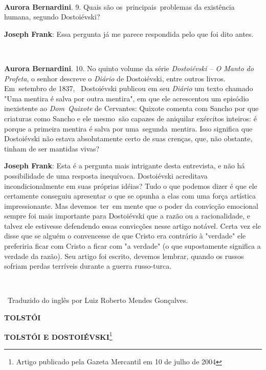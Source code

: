 ~

\textbf{Aurora Bernardini}. 9. Quais são os~principais~problemas da
existência humana, segundo Dostoiévski?

\textbf{Joseph Frank}: Essa pergunta já me parece respondida pelo que
foi dito antes.

~

\textbf{Aurora Bernardini}. 10. No quinto volume da série
\emph{Dostoiévski -- O Manto do Profeta}, o senhor descreve o
\emph{Diário} de Dostoiévski, entre outros livros. Em~setembro de 1837,
~Dostoiévski publicou em seu \emph{Diário} um texto chamado "Uma mentira
é salva por outra mentira", em que ele acrescentou um episódio
inexistente ao \emph{Dom~Quixote} de Cervantes: Quixote comenta com
Sancho por que criaturas como Sancho e ele mesmo\emph{~}são capazes de
aniquilar exércitos inteiros: é porque a primeira mentira é salva por
uma~segunda~mentira. Isso significa que Dostoiévski não estava
absolutamente certo de suas crenças, que, não obstante, tinham de ser
mantidas vivas?

\textbf{Joseph Frank}: Esta é a pergunta mais intrigante desta
entrevista, e não há possibilidade de uma resposta inequívoca.
Dostoiévski acreditava incondicionalmente em suas próprias idéias? Tudo
o que podemos dizer é que ele certamente conseguiu apresentar o que se
opunha a elas com uma força artística impressionante. Mas devemos~ter~em
mente que o poder da convicção emocional sempre foi mais importante para
Dostoiévski que a razão ou a racionalidade, e talvez ele estivesse
defendendo essas convicções nesse artigo notável. Certa vez ele disse
que se alguém o convencesse de que Cristo era contrário à "verdade" ele
preferiria ficar com Cristo a ficar com "a verdade" (o que supostamente
significa a verdade da razão). Seu artigo foi escrito, devemos lembrar,
quando os russos sofriam perdas terríveis durante a guerra russo-turca.

~

~Traduzido do inglês por Luiz Roberto Mendes Gonçalves.

\textbf{TOLSTÓI}

\textbf{TOLSTÓI E DOSTOIÉVSKI}\footnote{Artigo publicado pela Gazeta
  Mercantil em 10 de julho de 2004}

